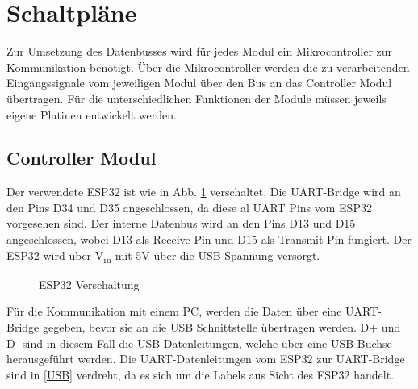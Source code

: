 \section{Schaltpläne}

Zur Umsetzung des Datenbusses wird für jedes Modul ein Mikrocontroller zur Kommunikation benötigt. 
Über die Mikrocontroller werden die zu verarbeitenden Eingangssignale vom jeweiligen Modul über den Bus an das Controller Modul übertragen. Für die 
unterschiedlichen Funktionen der Module müssen jeweils eigene Platinen entwickelt werden. 


\subsection{Controller Modul}
Der verwendete ESP32 ist wie in Abb. \ref{ESP} verschaltet. Die UART-Bridge wird an den Pins D34 und D35 angeschlossen, da diese al UART Pins vom ESP32 vorgesehen sind. Der interne Datenbus wird an den Pins D13 und D15 angeschlossen, wobei D13 als Receive-Pin und D15 als Transmit-Pin fungiert. Der ESP32 wird über V\textsubscript{in} mit 5V über die USB Spannung versorgt.

\begin{figure}[H]
    \centering    
    \caption{ESP32 Verschaltung}
    \label{ESP}
\end{figure}

Für die Kommunikation mit einem PC, werden die Daten über eine UART-Bridge gegeben, bevor sie an die USB Schnittstelle übertragen werden. D+ und D- sind in diesem Fall die USB-Datenleitungen, welche über eine USB-Buchse herausgeführt werden. Die UART-Datenleitungen vom ESP32 zur UART-Bridge sind in \ref{USB} verdreht, da es sich um die Labels aus Sicht des ESP32 handelt.


